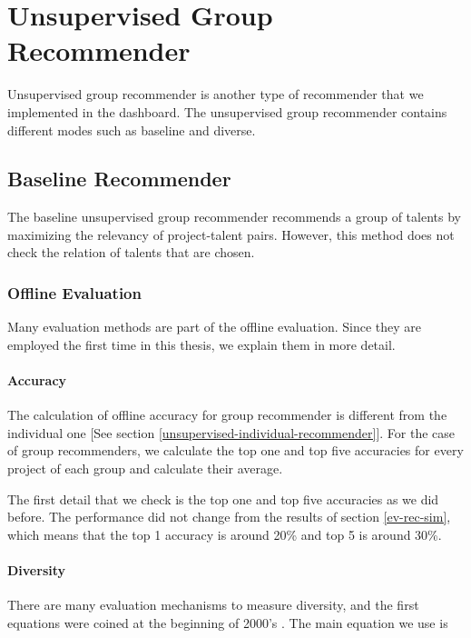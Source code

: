 \section{Unsupervised Group Recommender}\label{ev:unsupervised-group-rec}

Unsupervised group recommender is another type of recommender that we implemented in the dashboard. The unsupervised group recommender contains different modes such as baseline and diverse. 


\subsection{Baseline Recommender}

The baseline unsupervised group recommender recommends a group of talents by maximizing the relevancy of project-talent pairs. However, this method does not check the relation of talents that are chosen. 

\subsubsection{Offline Evaluation}

Many evaluation methods are part of the offline evaluation. Since they are employed the first time in this thesis, we explain them in more detail.

\paragraph{Accuracy}

The calculation of offline accuracy for group recommender is different from the individual one [See section \ref{unsupervised-individual-recommender}]. For the case of group recommenders, we calculate the top one and top five accuracies for every project of each group and calculate their average.

The first detail that we check is the top one and top five accuracies as we did before. The performance did not change from the results of section \ref{ev-rec-sim}, which means that the top 1 accuracy is around 20\% and top 5 is around 30\%.

\paragraph{Diversity}\label{ev-unsupervised-group-diversity}

There are many evaluation mechanisms to measure diversity, and the first equations were coined at the beginning of 2000's \cite{smyth2001similarity}. The main equation we use is

